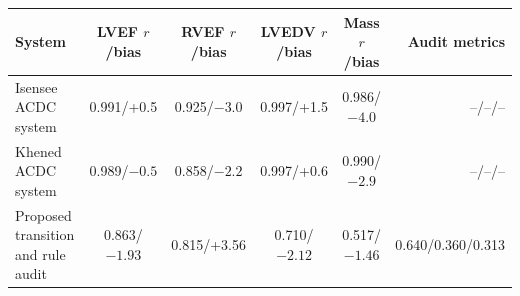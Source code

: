 \setcounter{table}{8}\label{tab:acdc_correlation_bias}
\begin{tabular}{lccccr}
\toprule
System & LVEF \(r\)/bias & RVEF \(r\)/bias & LVEDV \(r\)/bias & Mass \(r\)/bias & Audit metrics \\
\midrule
Isensee ACDC system & 0.991/+0.5 & 0.925/$-3.0$ & 0.997/+1.5 & 0.986/$-4.0$ & --/--/-- \\
Khened ACDC system & 0.989/$-0.5$ & 0.858/$-2.2$ & 0.997/+0.6 & 0.990/$-2.9$ & --/--/-- \\
Proposed transition and rule audit & 0.863/$-1.93$ & 0.815/+3.56 & 0.710/$-2.12$ & 0.517/$-1.46$ & 0.640/0.360/0.313 \\
\bottomrule
\end{tabular}
